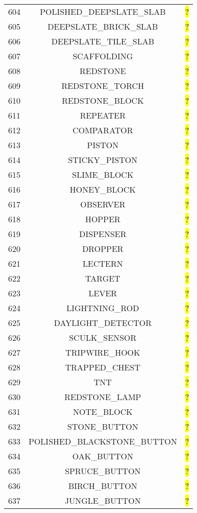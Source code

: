 \documentclass[11pt]{article}
\newcommand\myworries[1]{\sethlcolor{red}\hl{#1}}
\begin{document}
\begin{longtable}{ |c|c|c| }
604 & POLISHED\_DEEPSLATE\_SLAB & \myworries{?} \\
605 & DEEPSLATE\_BRICK\_SLAB & \myworries{?} \\
606 & DEEPSLATE\_TILE\_SLAB & \myworries{?} \\
607 & SCAFFOLDING & \myworries{?} \\
608 & REDSTONE & \myworries{?} \\
609 & REDSTONE\_TORCH & \myworries{?} \\
610 & REDSTONE\_BLOCK & \myworries{?} \\
611 & REPEATER & \myworries{?} \\
612 & COMPARATOR & \myworries{?} \\
613 & PISTON & \myworries{?} \\
614 & STICKY\_PISTON & \myworries{?} \\
615 & SLIME\_BLOCK & \myworries{?} \\
616 & HONEY\_BLOCK & \myworries{?} \\
617 & OBSERVER & \myworries{?} \\
618 & HOPPER & \myworries{?} \\
619 & DISPENSER & \myworries{?} \\
620 & DROPPER & \myworries{?} \\
621 & LECTERN & \myworries{?} \\
622 & TARGET & \myworries{?} \\
623 & LEVER & \myworries{?} \\
624 & LIGHTNING\_ROD & \myworries{?} \\
625 & DAYLIGHT\_DETECTOR & \myworries{?} \\
626 & SCULK\_SENSOR & \myworries{?} \\
627 & TRIPWIRE\_HOOK & \myworries{?} \\
628 & TRAPPED\_CHEST & \myworries{?} \\
629 & TNT & \myworries{?} \\
630 & REDSTONE\_LAMP & \myworries{?} \\
631 & NOTE\_BLOCK & \myworries{?} \\
632 & STONE\_BUTTON & \myworries{?} \\
633 & POLISHED\_BLACKSTONE\_BUTTON & \myworries{?} \\
634 & OAK\_BUTTON & \myworries{?} \\
635 & SPRUCE\_BUTTON & \myworries{?} \\
636 & BIRCH\_BUTTON & \myworries{?} \\
637 & JUNGLE\_BUTTON & \myworries{?} \\

\end{longtable}
\end{document}
